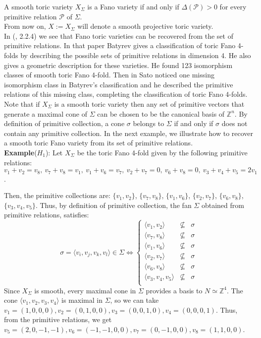 \documentclass[10pt]{article}
\begin{document}
A smooth toric variety $X_{\Sigma}$ is a Fano variety  if and only if $\Delta(\mathcal{P})>0$ for every primitive relation $\mathcal{P}$ of $\Sigma$.\\

From now on, $X:=X_{\Sigma}$ will denote a smooth projective toric variety.\\
In (\cite{bat}, 2.2.4) we see that Fano toric varieties can be recovered from the set of primitive relations. In that paper Batyrev gives a classification of toric Fano 4-folds by describing the possible sets of primitive relations in dimension 4. He also gives
  a geometric description for these varieties. He found 123 isomorphism classes of smooth toric Fano 4-fold. Then in \cite{sato} Sato noticed one missing isomorphism class in Batyrev's classification and he described the primitive relations of this missing class, completing the classification of toric Fano 4-folds. \\
 Note that if $X_{\Sigma}$ is a smooth toric variety then any set of primitive vectors that generate a maximal cone of $\Sigma$ can be chosen to be the canonical basis of $\mathbb{Z}^n$. By definition of primitive collection, a cone $\sigma$ belongs to $\Sigma$ if and only if $\sigma$ does not contain any primitive collection. In the next example, we illustrate how to recover a smooth toric Fano variety from its set of primitive relations.
\\

  \textbf{Example}($H_1$):
Let $X_{\Sigma}$ be the toric Fano 4-fold given by the following primitive relations:\\
$v_1+v_2=v_8, \ v_7+v_8=v_1, \ v_1+v_6=v_7,  \ v_2+v_7=0, \ v_6+v_8=0, \ v_3+v_4+v_5=2v_1$. 

Then, the primitive collections are: $\{v_1,v_2\}$, $\{v_7,v_8\}$, $\{v_1,v_6\}$, $\{v_2,v_7\}$, $\{v_6,v_8\}$, $\{v_3,v_4,v_5\}$.
Thus, by definition of primitive collection, the fan $\Sigma$ obtained from primitive relations, satisfies:\\
$$\sigma=\langle v_i,v_j,v_k,v_l\rangle \in \Sigma \Leftrightarrow
\left\{
\begin{array}{lll}
\langle v_1,v_2\rangle & \nsubseteq & \sigma \\
\langle v_7,v_8\rangle & \nsubseteq & \sigma \\
\langle v_1,v_6\rangle & \nsubseteq & \sigma \\
\langle v_2,v_7\rangle & \nsubseteq & \sigma \\
\langle v_6,v_8\rangle & \nsubseteq & \sigma \\
\langle v_3,v_4,v_5\rangle & \nsubseteq & \sigma \\
\end{array}
\right.
$$
Since $X_{\Sigma}$ is smooth, every maximal cone in $\Sigma$ provides a basis to $N\simeq \mathbb{Z}^4$.
The cone $\langle v_1,v_2,v_3,v_4\rangle$ is maximal in $\Sigma$, so we can take $v_1=(1,0,0,0), v_2=(0,1,0,0), v_3=(0,0,1,0), v_4=(0,0,0,1)$. Thus, from the primitive relations, we get $v_5=(2,0,-1,-1), v_6=(-1,-1,0,0), v_7=(0,-1,0,0), v_8=(1,1,0,0)$.
  \\
 
\end{document}

